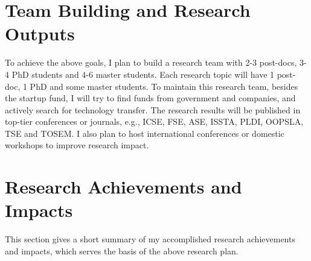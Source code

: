 \documentclass[a4paper]{article}
\begin{document}
\section{Team Building and Research Outputs}
To achieve the above goals, I plan to build a research team with 2-3 post-docs, 3-4 PhD students and 4-6 master students. Each research topic will have 1 post-doc, 1 PhD and some master students. To maintain this research team, besides the startup fund, I will try to find funds from government and companies, and actively search for technology transfer.
The research results will be published in top-tier conferences or journals, e.g., ICSE, FSE, ASE, ISSTA, PLDI, OOPSLA, TSE and TOSEM.
I also plan to host international conferences or domestic workshops to improve research impact.

\section{Research Achievements and Impacts}

This section gives a short summary of my accomplished research achievements and impacts, which serves the basis of the above research plan.
\end{document}
